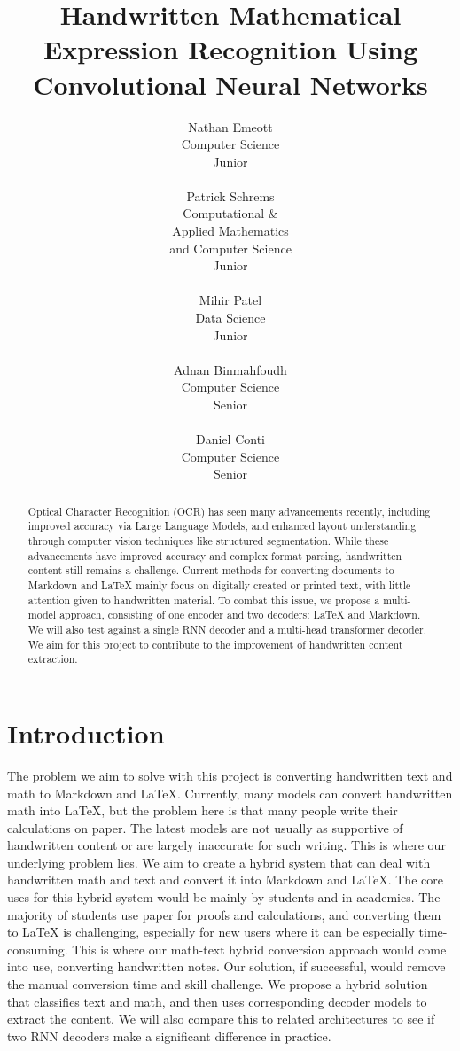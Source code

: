 \documentclass[11pt]{article}
\title{Handwritten Mathematical Expression Recognition Using Convolutional Neural Networks}
\author{
    Nathan Emeott \\
    Computer Science \\
    Junior \\
    \\\And
    Patrick Schrems \\
    Computational \& \\Applied Mathematics \\
    and Computer Science \\
    Junior \\
    \\\And
    Mihir Patel \\
    Data Science \\
    Junior \\
    \\\And
    Adnan Binmahfoudh \\
    Computer Science \\
    Senior \\
    \\\And
    Daniel Conti \\
    Computer Science \\
    Senior \\
}
\begin{document}
\maketitle


\begin{abstract}
	Optical Character Recognition (OCR) has seen many advancements recently, including improved accuracy via Large Language Models, and enhanced layout understanding through computer vision techniques like structured segmentation. While these advancements have improved accuracy and complex format parsing, handwritten content still remains a challenge. Current methods for converting documents to Markdown and \LaTeX{} mainly focus on digitally created or printed text, with little attention given to handwritten material. To combat this issue, we propose a multi-model approach, consisting of one encoder and two decoders: \LaTeX{} and Markdown. We will also test against a single RNN decoder and a multi-head transformer decoder. We aim for this project to contribute to the improvement of handwritten content extraction.

\end{abstract}

\section{Introduction}

The problem we aim to solve with this project is converting handwritten text and math to Markdown and LaTeX. Currently, many models can convert handwritten math into LaTeX, but the problem here is that many people write their calculations on paper. The latest models are not usually as supportive of handwritten content or are largely inaccurate for such writing. This is where our underlying problem lies. We aim to create a hybrid system that can deal with handwritten math and text and convert it into Markdown and LaTeX. The core uses for this hybrid system would be mainly by students and in academics. The majority of students use paper for proofs and calculations, and converting them to LaTeX is challenging, especially for new users where it can be especially time-consuming. This is where our math-text hybrid conversion approach would come into use, converting handwritten notes. Our solution, if successful, would remove the manual conversion time and skill challenge. We propose a hybrid solution that classifies text and math, and then uses corresponding decoder models to extract the content. We will also compare this to related architectures to see if two RNN decoders make a significant difference in practice.
\end{document}
